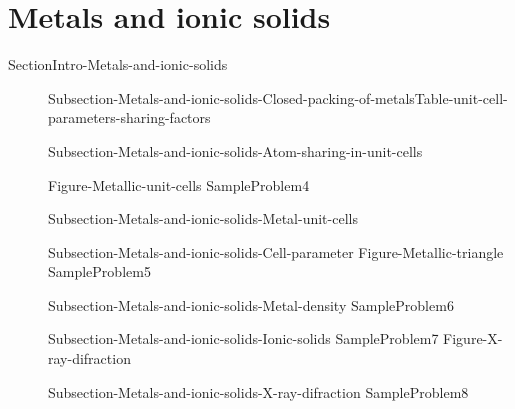 \documentclass[main.tex]{subfiles}
\begin{document}
\section{Metals and ionic solids}{SectionIntro-Metals-and-ionic-solids}
\sloppy \begin{description}
\item[] {Subsection-Metals-and-ionic-solids-Closed-packing-of-metals}{Table-unit-cell-parameters-sharing-factors}
\item[]  {Subsection-Metals-and-ionic-solids-Atom-sharing-in-unit-cells}

{Figure-Metallic-unit-cells}
{SampleProblem4}
\item[] {Subsection-Metals-and-ionic-solids-Metal-unit-cells}
\item[]  {Subsection-Metals-and-ionic-solids-Cell-parameter}
{Figure-Metallic-triangle}
{SampleProblem5}
\item[]  {Subsection-Metals-and-ionic-solids-Metal-density}
{SampleProblem6}
\item[] {Subsection-Metals-and-ionic-solids-Ionic-solids}
{SampleProblem7}
{Figure-X-ray-difraction}
\item[] {Subsection-Metals-and-ionic-solids-X-ray-difraction}
{SampleProblem8}
\end{description}
\end{document}
